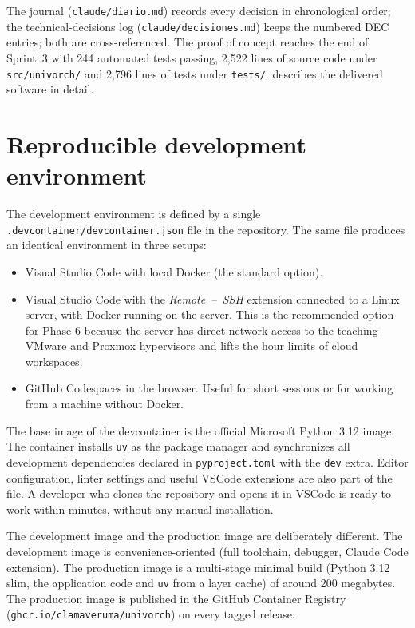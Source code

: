 The journal (\texttt{claude/diario.md}) records every decision in
chronological order; the technical-decisions log
(\texttt{claude/decisiones.md}) keeps the numbered DEC entries; both
are cross-referenced. The proof of concept reaches the end of
Sprint~3 with 244 automated tests passing, 2{,}522 lines of source
code under \texttt{src/univorch/} and 2{,}796 lines of tests under
\texttt{tests/}.  describes the delivered
software in detail.

\section{Reproducible development environment}
\label{sec:entorno}

The development environment is defined by a single
\texttt{.devcontainer/devcontainer.json} file in the repository. The
same file produces an identical environment in three setups:

\begin{itemize}
  \item Visual Studio Code with local Docker (the standard option).
  \item Visual Studio Code with the \emph{Remote~--~SSH} extension
        connected to a Linux server, with Docker running on the
        server. This is the recommended option for Phase 6 because
        the server has direct network access to the teaching VMware
        and Proxmox hypervisors and lifts the hour limits of cloud
        workspaces.
  \item GitHub Codespaces in the browser. Useful for short sessions
        or for working from a machine without Docker.
\end{itemize}

The base image of the devcontainer is the official Microsoft Python
3.12 image. The container installs \texttt{uv} as the
package manager and synchronizes all development dependencies
declared in \texttt{pyproject.toml} with the \texttt{dev} extra.
Editor configuration, linter settings and useful VSCode extensions
are also part of the file. A developer who clones the repository and
opens it in VSCode is ready to work within minutes, without any
manual installation.

The development image and the production image are deliberately
different. The development image is convenience-oriented (full
toolchain, debugger, Claude Code extension). The production image is
a multi-stage minimal build (Python 3.12 slim, the application code
and \texttt{uv} from a layer cache) of around 200 megabytes. The
production image is published in the GitHub Container Registry
(\texttt{ghcr.io/clamaveruma/univorch}) on every tagged release.

